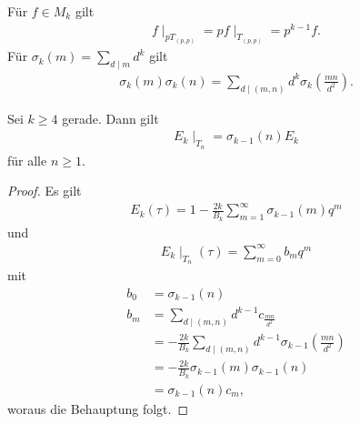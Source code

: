 \begin{bem}
Für $f\in M_k$ gilt
\begin{align*}
f\mid_{pT_{(p,p)}}=p f \mid_{T_{(p,p)}}=p^{k-1} f.
\end{align*}
Für $\sigma_k(m)=\sum_{d\mid m}d^k$ gilt
\begin{align*}
\sigma_k(m)\sigma_k(n)=\sum_{d \mid (m,n)} d^k \sigma_k\left(\frac{mn}{d^2}\right).
\end{align*}
\end{bem}

\begin{prop}
Sei $k\geq 4$ gerade.
Dann gilt
\begin{align*}
E_k \mid_{T_n}=\sigma_{k-1}(n)E_k
\end{align*}
für alle $n\geq 1$.
\end{prop}
\begin{proof}
Es gilt
\begin{align*}
E_k(\tau)=1-\frac{2k}{B_k}\sum_{m=1}^\infty \sigma_{k-1}(m)q^m
\end{align*}
und
\begin{align*}
E_k\mid_{T_n} (\tau)=\sum_{m=0}^\infty b_mq^m
\end{align*}
mit
\begin{align*}
b_0&=\sigma_{k-1}(n)\\
b_m&=\sum_{d\mid(m,n)}d^{k-1}c_{\frac{mn}{d^2}}\\
&=-\frac{2k}{B_k} \sum_{d \mid (m,n)} d^{k-1} \sigma_{k-1}\left(\frac{mn}{d^2}\right)\\
&=-\frac{2k}{B_k} \sigma_{k-1}(m)\sigma_{k-1}(n)\\
&=\sigma_{k-1}(n)c_m,
\end{align*}
woraus die Behauptung folgt.
\end{proof}

